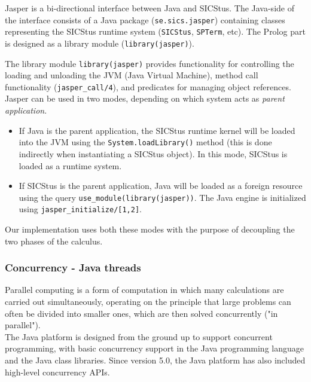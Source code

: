 \documentclass[a4paper, 11pt, oneside]{elsarticle}
\begin{document}
Jasper is a bi-directional interface between Java and SICStus. The Java-side of the interface consists of a Java package (\verb$se.sics.jasper$) containing classes representing the SICStus runtime system (\verb$SICStus$, \verb$SPTerm$, etc). The Prolog part is designed as a library module (\verb$library(jasper)$).

The library module \verb$library(jasper)$  provides functionality for controlling the loading and unloading the JVM (Java Virtual Machine), method call functionality (\verb$jasper_call/4$), and predicates for managing object references.\\

Jasper can be used in two modes, depending on which system acts as \emph{parent application}.
\begin{itemize}
\item If Java is the parent application, the SICStus runtime kernel will be loaded into the JVM using the \verb$System.loadLibrary()$ method (this is done indirectly when instantiating a SICStus object). In this mode, SICStus is loaded as a runtime system.

\item If SICStus is the parent application, Java will be loaded as a foreign resource using the query \verb$use_module(library(jasper))$. The Java engine is initialized using \verb$jasper_initialize/[1,2]$\cite{sicstus_jasper}.
\end{itemize}

Our implementation uses both these modes with the purpose of decoupling the two phases of the calculus.


\subsubsection{Concurrency - Java threads}
Parallel computing is a form of computation in which many calculations are carried out simultaneously, operating on the principle that large problems can often be divided into smaller ones, which are then solved concurrently ("in parallel")\cite{Almasi:1989:HPC:160438}.\\

The Java platform is designed from the ground up to support concurrent programming, with basic concurrency support in the Java programming language and the Java class libraries. Since version 5.0, the Java platform has also included high-level concurrency APIs\cite{oracle_thread}.\\
\end{document}
